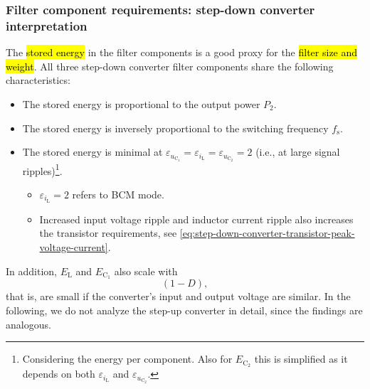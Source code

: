 \begin{frame}
	\frametitle{Filter component requirements: step-down converter interpretation}
	The \hl{stored energy} in the filter components is a good proxy for the \hl{filter size and weight}. \onslide<+->All three step-down converter filter components share the following characteristics:
	\begin{itemize}
		\item<+-> The stored energy is proportional to the output power $P_2$.
		\item<+-> The stored energy is inversely proportional to the switching frequency $f_\mathrm{s}$.
		\item<+-> The stored energy is minimal at $\varepsilon_{u_\mathrm{C_1}} = \varepsilon_{i_\mathrm{L}} = \varepsilon_{u_\mathrm{C_2}} = 2$ (i.e., at large signal ripples)\footnote{Considering the energy per component. Also for $E_\mathrm{C_2}$ this is simplified as it depends on both $\varepsilon_{i_\mathrm{L}}$ and $\varepsilon_{u_\mathrm{C_2}}$.}.
		      \begin{itemize}
			      \item<+-> $\varepsilon_{i_\mathrm{L}}=2$ refers to BCM mode.
			      \item<+-> Increased input voltage ripple and inductor current ripple also increases the transistor requirements, see \eqref{eq:step-down-converter-transistor-peak-voltage-current}.
		      \end{itemize}
	\end{itemize}\onslide<+->
	In addition, $E_\mathrm{L}$ and $E_\mathrm{C_1}$ also scale with $$(1-D),$$ that is, are small if the converter's input and output voltage are similar. In the following, we do not analyze the step-up converter in detail, since the findings are analogous.
\end{frame}



